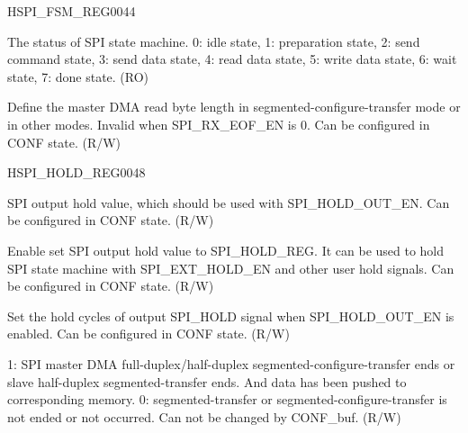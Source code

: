 \begin{register}{H}{SPI\_FSM\_REG}{\hexprefix{}0044}\label{regdesc:SPIFSMREG}
%
%
%
\regnewline%
\begin{regdesc}\begin{reglist}
\label{fielddesc:SPIST}\item [SPI\_ST] The status of SPI state machine. 0: idle state, 1: preparation state, 2: send command state, 3: send data state, 4: read data state, 5: write data state, 6: wait state, 7: done state. (RO)
\label{fielddesc:SPIMSTDMARDBYTELEN}\item [SPI\_MST\_DMA\_RD\_BYTELEN] Define the master DMA read byte length in segmented-configure-transfer mode or in other modes. Invalid when SPI\_RX\_EOF\_EN is 0. Can be configured in CONF state. (R/W)
\end{reglist}\end{regdesc}
\end{register}


\begin{register}{H}{SPI\_HOLD\_REG}{\hexprefix{}0048}\label{regdesc:SPIHOLDREG}
%
%
%
%
%
%
\regnewline%
\begin{regdesc}\begin{reglist}
\label{fielddesc:SPIHOLDVALREG}\item [SPI\_HOLD\_VAL\_REG] SPI output hold value, which should be used with SPI\_HOLD\_OUT\_EN. Can be configured in CONF state. (R/W)
\label{fielddesc:SPIHOLDOUTEN}\item [SPI\_HOLD\_OUT\_EN] Enable set SPI output hold value to SPI\_HOLD\_REG. It can be used to hold SPI state machine with SPI\_EXT\_HOLD\_EN and other user hold signals. Can be configured in CONF state. (R/W)
\label{fielddesc:SPIHOLDOUTTIME}\item [SPI\_HOLD\_OUT\_TIME] Set the hold cycles of output SPI\_HOLD signal when SPI\_HOLD\_OUT\_EN is enabled. Can be configured in CONF state. (R/W)
\label{fielddesc:SPIDMASEGTRANSDONE}\item [SPI\_DMA\_SEG\_TRANS\_DONE] 1: SPI master DMA full-duplex/half-duplex segmented-configure-transfer ends or slave half-duplex segmented-transfer ends. And data has been pushed to corresponding memory. 0: segmented-transfer or segmented-configure-transfer is not ended or not occurred. Can not be changed by CONF\_buf. (R/W)
\end{reglist}\end{regdesc}
\end{register}


